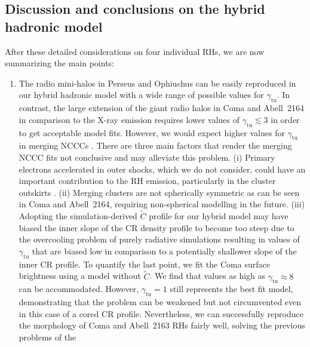 \documentclass[traditabstract]{aa}
\newcommand{\rmn}{\mathrm}
\begin{document}

\subsection{Discussion and conclusions on the hybrid hadronic model}

After these detailed considerations on four individual RHs, we
are now summarizing the main points:
\begin{enumerate} 
\item The radio mini-halos in Perseus and Ophiuchus can be easily reproduced in
  our hybrid hadronic model with a wide range of possible values for
  $\gamma_{\rmn{tu}}$. In contrast, the large extension of the giant radio halos
  in Coma and Abell~2164 in comparison to the X-ray emission requires lower
  values of $\gamma_{\rmn{tu}}\lesssim3$ in order to get acceptable model
  fits. However, we would expect higher values for $\gamma_{\rmn{tu}}$ in
  merging NCCCs \citep{2011A&A...527A..99E}.  There are three main factors that
  render the merging NCCC fits not conclusive and may alleviate this problem.
  (i) Primary electrons accelerated in outer shocks, which we do not consider,
  could have an important contribution to the RH emission, particularly in the
  cluster outskirts \citep{2008MNRAS.385.1211P}.  (ii) Merging clusters are not
  spherically symmetric as can be seen in Coma and Abell~2164, requiring
  non-spherical modelling in the future. (iii) Adopting the simulation-derived
  $\tilde{C}$ profile \citep{2010MNRAS.409..449P} for our hybrid model may have
  biased the inner slope of the CR density profile to become too steep due to
  the overcooling problem of purely radiative simulations resulting in values of
  $\gamma_{\rmn{tu}}$ that are biased low in comparison to a potentially
  shallower slope of the inner CR profile. To quantify the last point, we fit
  the Coma surface brightness using a model without $\tilde{C}$. We find that
  values as high as $\gamma_{\rmn{tu}} \approx 8$ can be accommodated. However,
  $\gamma_{\rmn{tu}}=1$ still represents the best fit model, demonstrating that
  the problem can be weakened but not circumvented even in this case of a cored
  CR profile. Nevertheless, we can successfully reproduce the morphology of Coma
  and Abell~2163 RHs fairly well, solving the previous problems of the

\end{enumerate}
\end{document}
